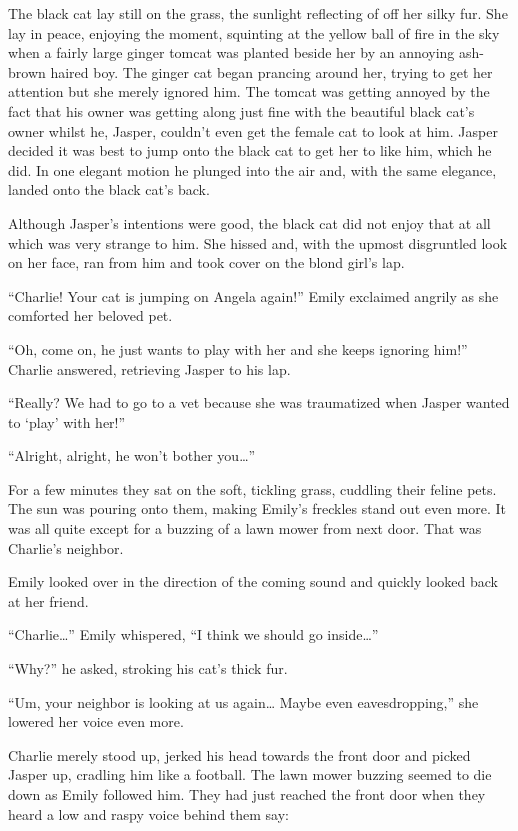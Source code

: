 The black cat lay still on the grass, the sunlight reflecting of off her silky fur. She lay in peace, enjoying the moment, squinting at the yellow ball of fire in the sky when a fairly large ginger tomcat was planted beside her by an annoying ash-brown haired boy. The ginger cat began prancing around her, trying to get her attention but she merely ignored him. The tomcat was getting annoyed by the fact that his owner was getting along just fine with the beautiful black cat’s owner whilst he, Jasper, couldn’t even get the female cat to look at him. Jasper decided it was best to jump onto the black cat to get her to like him, which he did. In one elegant motion he plunged into the air and, with the same elegance, landed onto the black cat’s back.

Although Jasper’s intentions were good, the black cat did not enjoy that at all which was very strange to him. She hissed and, with the upmost disgruntled look on her face, ran from him and took cover on the blond girl’s lap.

“Charlie! Your cat is jumping on Angela again!” Emily exclaimed angrily as she comforted her beloved pet.

“Oh, come on, he just wants to play with her and she keeps ignoring him!” Charlie answered, retrieving Jasper to his lap.

“Really? We had to go to a vet because she was traumatized when Jasper wanted to ‘play’ with her!”

“Alright, alright, he won’t bother you…”

For a few minutes they sat on the soft, tickling grass, cuddling their feline pets. The sun was pouring onto them, making Emily’s freckles stand out even more. It was all quite except for a buzzing of a lawn mower from next door. That was Charlie’s neighbor.

Emily looked over in the direction of the coming sound and quickly looked back at her friend.

“Charlie…” Emily whispered, “I think we should go inside…”

“Why?” he asked, stroking his cat’s thick fur.

“Um, your neighbor is looking at us again… Maybe even eavesdropping,” she lowered her voice even more.

Charlie merely stood up, jerked his head towards the front door and picked Jasper up, cradling him like a football. The lawn mower buzzing seemed to die down as Emily followed him. They had just reached the front door when they heard a low and raspy voice behind them say:

